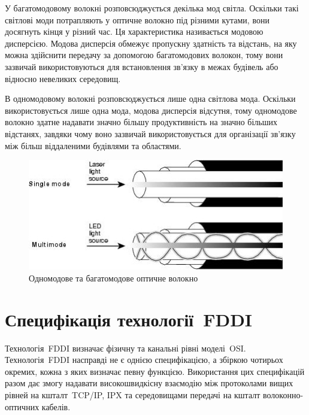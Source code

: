 \documentclass[
	a4paper,
	oneside,
	BCOR = 10mm,
	DIV = 12,
	12pt,
	headings = normal,
]{scrartcl}
\begin{document}
		У багатомодовому волокні розповсюджується декілька мод світла. Оскільки такі світлові моди потрапляють у оптичне волокно під різними кутами, вони досягнуть кінця у різний час. Ця характеристика називається модовою дисперсією. Модова дисперсія обмежує пропускну здатність та відстань, на яку можна здійснити передачу за допомогою багатомодових волокон, тому вони зазвичай використовуються для встановлення зв'язку в межах будівель або відносно невеликих середовищ.

		В одномодовому волокні розповсюджується лише одна світлова мода. Оскільки використовується лише одна мода, модова дисперсія відсутня, тому одномодове волокно здатне надавати значно більшу продуктивність на значно більших відстанях, завдяки чому воно зазвичай використовується для організації зв'язку між більш віддаленими будівлями та областями.

		\begin{figure}[!htbp]
			\centering
			\includegraphics[height = 8\baselineskip]{./assets/y03s01-telecom-homework-01-p02-optical-fibres.jpg}
			\caption{Одномодове та багатомодове оптичне волокно}
			\label{fig:single-and-multimode-fibre}
		\end{figure}

	\section{Специфікація технології~\textenglish{FDDI}}
		Технологія~\textenglish{FDDI} визначає фізичну та канальні рівні моделі~\textenglish{OSI}. Технологія~\textenglish{FDDI} насправді не є однією специфікацією, а збіркою чотирьох окремих, кожна з яких визначає певну функцією. Використання цих специфікацій разом дає змогу надавати високошвидкісну взаємодію між протоколами вищих рівней на кшталт~\textenglish{TCP/IP, IPX} та середовищами передачі на кшталт волоконно-оптичних кабелів.
\end{document}
